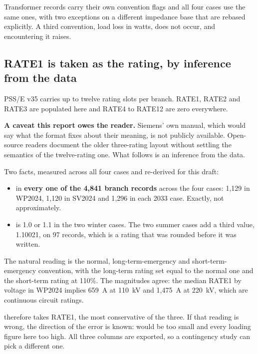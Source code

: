 \documentclass[11pt,a4paper]{article}
\begin{document}
Transformer records carry their own convention flags and all four cases use the
same ones, with two exceptions on a different impedance base that are rebased
explicitly. A third convention, load loss in watts, does not occur, and
encountering it raises.


\subsection{RATE1 is taken as the rating, by inference from the data}
\label{sec:rate}

PSS/E v35 carries up to twelve rating slots per branch. RATE1, RATE2 and RATE3
are populated here and RATE4 to RATE12 are zero everywhere.

\textbf{A caveat this report owes the reader.} Siemens' own manual, which would
say what the format fixes about their meaning, is not publicly available.
Open-source readers document the older three-rating layout without settling the
semantics of the twelve-rating one. What follows is an
inference from the data.

Two facts, measured across all four cases and re-derived for this draft:

\begin{itemize}
\item {} in \textbf{every one of the 4{,}841 branch records}
      across the four cases: 1{,}129 in WP2024, 1{,}120 in SV2024 and 1{,}296
      in each 2033 case. Exactly, not approximately.
\item {} is 1.0 or 1.1 in the two winter cases. The two summer
      cases add a third value, 1.10021, on 97 records, which is a rating that
      was rounded before it was written.
\end{itemize}

The natural reading is the normal, long-term-emergency and
short-term-emergency convention, with the long-term rating set equal to the
normal one and the short-term rating at 110\%. The magnitudes agree: the median
RATE1 by voltage in WP2024 implies 659~A at 110~kV and 1{,}475~A at 220~kV,
which are continuous circuit ratings.

 therefore takes RATE1, the most conservative of the three. If
that reading is wrong, the direction of the error is known:  would
be too small and every loading figure here too high. All three columns are
exported, so a contingency study can pick a different one.
\end{document}
